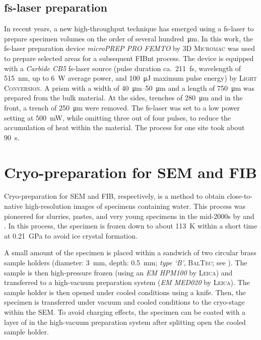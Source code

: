 \subsection[Femtosecond laser preparation]{\Acl*{fs-laser} preparation}

In recent years, a new high-throughput technique has emerged using a \ac{fs-laser} to prepare specimen volumes on the order of several hundred~\unit{\micro\meter}.
In this work, the \ac{fs-laser} preparation device \textit{microPREP PRO FEMTO} by \textsc{3D Micromac} was used to prepare selected areas for a subsequent \ac{FIBnt} process.
The device is equipped with a \textit{Carbide CB5} \ac{fs-laser} source (pulse duration ca.~\qty{211}{\femto\second}, wavelength of \qty{515}{\nano\meter}, up to \qty{6}{\watt} average power, and \qty{100}{\micro\joule} maximum pulse energy) by \textsc{Light Conversion}.
A prism with a width of \qtyrange{40}{50}{\micro\meter} and a length of \qty{750}{\micro\meter} was prepared from the bulk material.
At the sides, trenches of \qty{280}{\micro\meter} and in the front, a trench of \qty{250}{\micro\meter} were removed.
The \ac{fs-laser} was set to a low power setting at \qty{500}{\milli\watt}, while omitting three out of four pulses, to reduce the accumulation of heat within the material.
The process for one site took about \qty{90}{\second}.

\section{Cryo-preparation for \acs*{SEM} and \acs*{FIB}}
\label{sec:cryofibnt}

Cryo-preparation for \ac{SEM} and \ac{FIB}, respectively, is a method to obtain close-to-native high-resolution images of specimens containing water.
This process was pioneered for slurries, pastes, and very young specimens in the mid-2000s by \textcite{holzer.2007} and \textcite{zingg.2008}.
In this process, the specimen is frozen down to about \qty{113}{\kelvin} within a short time at \qty{0.21}{\giga\pascal} to avoid ice crystal formation.

A small amount of the specimen is placed within a sandwich of two circular brass sample holders (diameter: \qty{3}{\milli\meter}, depth: \qty{0.5}{\milli\meter}; \textit{type `B'}, \textsc{BalTec}; see ).
The sample is then high-pressure frozen (using an \textit{EM HPM100} by \textsc{Leica}) and transferred to a high-vacuum preparation system (\textit{EM MED020} by \textsc{Leica}).
The sample holder is then opened under cooled conditions using a knife.
Then, the specimen is transferred under vacuum and cooled conditions to the cryo-stage within the \ac{SEM}.
To avoid charging effects, the specimen can be coated with a layer of  in the high-vacuum preparation system after splitting open the cooled sample holder.

